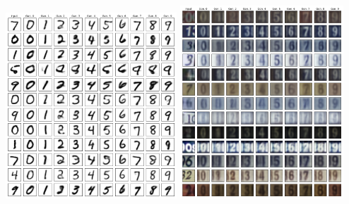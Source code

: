 \documentclass[portrait,fontscale=0.40,paperwidth=30in, paperheight=40in,margin=1in]{baposter} %
\theoremstyle{definition}
\theoremstyle{remark}
\begin{document}
\begin{poster}
{\begin{minipage}[b]{\textwidth}
\includegraphics[width=0.48\textwidth]{images/style.png}
\includegraphics[width=0.46\textwidth]{images/svhn_cvae_fc_style.png}
\centering
\end{minipage}
}












\end{poster}
\end{document}
